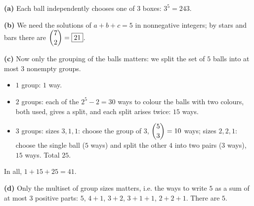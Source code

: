 \textbf{(a)} Each ball independently chooses one of $3$ boxes: $3^5=\boxed{243}$.

\textbf{(b)} We need the solutions of $a+b+c=5$ in nonnegative integers; by stars and bars there are $\dbinom{7}{2}=\boxed{21}$.

\textbf{(c)} Now only the grouping of the balls matters: we split the set of $5$ balls into at most $3$ nonempty groups.
\begin{itemize}
\item $1$ group: $1$ way.
\item $2$ groups: each of the $2^5-2=30$ ways to colour the balls with two colours, both used, gives a split, and each split arises twice: $15$ ways.
\item $3$ groups: sizes $3,1,1$: choose the group of $3$, $\dbinom53=10$ ways; sizes $2,2,1$: choose the single ball ($5$ ways) and split the other $4$ into two pairs ($3$ ways), $15$ ways. Total $25$.
\end{itemize}
In all, $1+15+25=\boxed{41}$.

\textbf{(d)} Only the multiset of group sizes matters, i.e. the ways to write $5$ as a sum of at most $3$ positive parts: $5$, $4+1$, $3+2$, $3+1+1$, $2+2+1$. There are $\boxed{5}$.
